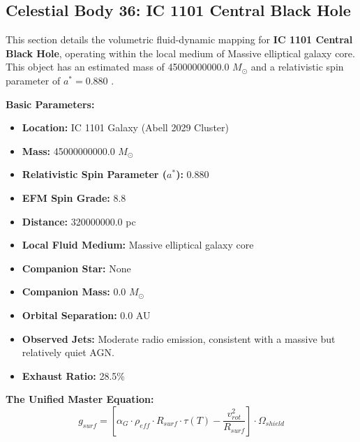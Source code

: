 \documentclass[11pt, a4paper]{article}
\begin{document}
\clearpage
\subsection{Celestial Body 36: IC 1101 Central Black Hole}
This section details the volumetric fluid-dynamic mapping for \textbf{IC 1101 Central Black Hole}, operating within the local medium of Massive elliptical galaxy core. This object has an estimated mass of 45000000000.0 $M_{\odot}$ and a relativistic spin parameter of $a^* = 0.880$ \cite{dullo2021, ned}.

\vspace{0.5em}
\noindent \textbf{Basic Parameters:}
\begin{itemize}
  \item \textbf{Location:} IC 1101 Galaxy (Abell 2029 Cluster)
  \item \textbf{Mass:} 45000000000.0 $M_{\odot}$
  \item \textbf{Relativistic Spin Parameter ($a^*$):} 0.880
  \item \textbf{EFM Spin Grade:} 8.8
  \item \textbf{Distance:} 320000000.0 pc
  \item \textbf{Local Fluid Medium:} Massive elliptical galaxy core
  \item \textbf{Companion Star:} None
  \item \textbf{Companion Mass:} 0.0 $M_{\odot}$
  \item \textbf{Orbital Separation:} 0.0 AU
  \item \textbf{Observed Jets:} Moderate radio emission, consistent with a massive but relatively quiet AGN.
  \item \textbf{Exhaust Ratio:} 28.5\%
\end{itemize}

\vspace{0.5em}
\noindent \textbf{The Unified Master Equation:}
$$ g_{surf} = \left[ \alpha_G \cdot \rho_{eff} \cdot R_{surf} \cdot \tau(T) - \frac{v_{rot}^2}{R_{surf}} \right] \cdot \Omega_{shield} $$
\end{document}
